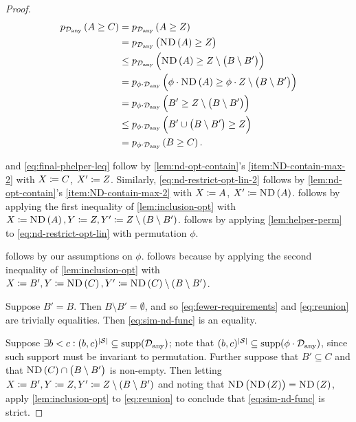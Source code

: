 \begin{proof}
\begin{align}
    \phelper{A\geq C}[\Dany]&=\phelper{A\geq Z}[\Dany]\label{eq:nd-restrict-opt-lin}\\ 
    &=\phelper{\ND{A}\geq Z}[\Dany]\label{eq:nd-restrict-opt-lin-2}\\
    &\leq \phelper{\ND{A}\geq Z\setminus\prn{B\setminus B'}}[\Dany]\label{eq:fewer-requirements}\\
    &= \phelper{\phi\cdot \ND{A}\geq \phi\cdot Z\setminus\prn{B\setminus B'}}[\phi\cdot \Dany]\label{eq:phi-helper-nd-opt}\\
    &= \phelper{B'\geq Z\setminus\prn{B\setminus B'}}[\phi\cdot \Dany]\label{eq:phi-assumptions}\\
    &\leq \phelper{B'\cup \prn{B\setminus B'}\geq Z}[\phi\cdot \Dany]\label{eq:reunion}\\
    &= \phelper{B\geq C}[\phi\cdot \Dany].\label{eq:final-phelper-leq}
\end{align}

 and \cref{eq:final-phelper-leq} follow by \cref{lem:nd-opt-contain}'s \cref{item:ND-contain-max-2} with $X\coloneqq C$, $X'\coloneqq Z$. Similarly, \cref{eq:nd-restrict-opt-lin-2} follows by \cref{lem:nd-opt-contain}'s \cref{item:ND-contain-max-2} with $X\coloneqq A$, $X'\coloneqq \text{\upshape\textsc{ND}}\left(A\right)$.  follows by applying the first inequality of \cref{lem:inclusion-opt} with $X\coloneqq \text{\upshape\textsc{ND}}\left(A\right), Y\coloneqq Z, Y'\coloneqq Z\setminus (B\setminus B')$.  follows by applying \cref{lem:helper-perm} to \cref{eq:nd-restrict-opt-lin} with permutation $\phi$. 

 follows by our assumptions on $\phi$.  follows because by applying the second inequality of \cref{lem:inclusion-opt} with $X\coloneqq B', Y\coloneqq \text{\upshape\textsc{ND}}\left(C\right), Y'\coloneqq \text{\upshape\textsc{ND}}\left(C\right)\setminus (B\setminus B')$.

Suppose $B'=B$. Then $B\setminus B'=\emptyset$, and so \cref{eq:fewer-requirements} and \cref{eq:reunion} are trivially equalities. Then \cref{eq:sim-nd-func} is an equality.

Suppose $\exists b<c: (b,c)^{\abs{\St}}\subseteq \supp[\Dany]$; note that $(b,c)^{\abs{\St}}\subseteq\supp[\phi\cdot \Dany]$, since such support must be invariant to permutation. Further suppose that $B'\subseteq C$ and that $\text{\upshape\textsc{ND}}\left(C\right)\cap \left(B\setminus B'\right)$ is non-empty. Then letting $X\coloneqq B', Y\coloneqq Z, Y'\coloneqq Z\setminus (B\setminus B')$ and noting that $\text{\upshape\textsc{ND}}\left(\text{\upshape\textsc{ND}}\left(Z\right)\right)=\text{\upshape\textsc{ND}}\left(Z\right)$, apply \cref{lem:inclusion-opt} to \cref{eq:reunion} to conclude that \cref{eq:sim-nd-func} is strict.
\end{proof}

